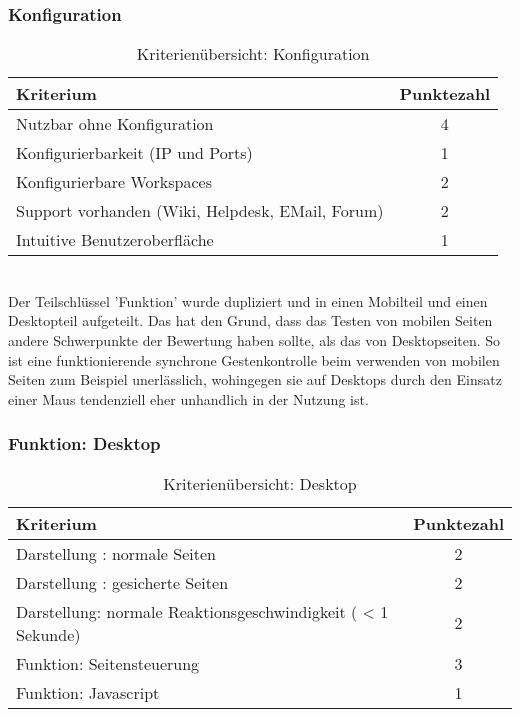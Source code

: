 \subsubsection{Konfiguration}
\begin{table}[H]
 	\vspace{-30pt}
 	\centering
		\begin{tabular}{| p{12cm} | c|}
			\hline
				Kriterium		 &	Punktezahl\\
			\hline
			\hline
				Nutzbar ohne Konfiguration			&4\\
				Konfigurierbarkeit (IP und Ports)			&	1	\\
				Konfigurierbare Workspaces			&	2	\\
				Support vorhanden (Wiki, Helpdesk, EMail, Forum)				&	2	\\
				Intuitive Benutzeroberfläche			&	1	\\
				\hline
		\end{tabular}
	\caption{Kriterienübersicht: Konfiguration}
\end{table}

\\Der Teilschlüssel 'Funktion' wurde dupliziert und in einen Mobilteil und einen Desktopteil aufgeteilt. Das hat den Grund, dass das Testen von mobilen Seiten \mbox{andere} Schwerpunkte der Bewertung haben sollte, als das von \mbox{Desktopseiten}. So ist eine funktionierende synchrone Gestenkontrolle beim verwenden von mobilen Seiten zum Beispiel unerlässlich, wohingegen sie auf Desktops durch den Einsatz einer Maus tendenziell eher unhandlich in der Nutzung ist.
\subsubsection{Funktion: Desktop}
\begin{table}[H]
 	\vspace{-30pt}
 	\centering
		\begin{tabular}{| p{12cm} | c|}
			\hline
				Kriterium		 &	Punktezahl\\
			\hline
			\hline
				Darstellung : normale Seiten			&2\\
				Darstellung : gesicherte Seiten		&	2	\\
				 Darstellung: normale Reaktionsgeschwindigkeit ( < 1 Sekunde)	&	2	\\
				Funktion: Seitensteuerung			&	3	\\
				Funktion: Javascript			&	1	\\
				\hline
		\end{tabular}
	\caption{Kriterienübersicht: Desktop}
\end{table}

